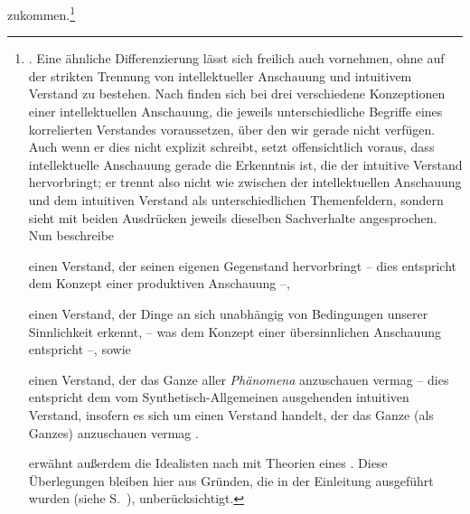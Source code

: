 zukommen.\footnote{\cite[Vgl.][175--180]{Foerster:DieBedeutungvonSS7677deremphKritikderUrteilskraftfuerdieEntwicklungdernachkantischenPhilosophieTeil12002}.
Eine ähnliche Differenzierung lässt sich freilich auch vornehmen, ohne auf der
strikten Trennung von intellektueller Anschauung und intuitivem Verstand zu
bestehen. Nach  finden sich bei
 drei verschiedene Konzeptionen einer intellektuellen
Anschauung, die jeweils unterschiedliche Begriffe eines korrelierten Verstandes
voraussetzen, über den wir gerade nicht verfügen.
Auch wenn er dies nicht explizit schreibt, setzt 
offensichtlich voraus, dass intellektuelle Anschauung gerade die Erkenntnis ist, die der intuitive Verstand
hervorbringt; er trennt also nicht wie
zwischen der intellektuellen Anschauung und dem intuitiven Verstand als
unterschiedlichen Themenfeldern, sondern sieht mit beiden Ausdrücken jeweils
dieselben Sachverhalte angesprochen. Nun beschreibe
\begin{nummerierung}
  \item einen Verstand, der seinen eigenen Gegenstand
  hervorbringt -- dies  entspricht dem Konzept einer produktiven Anschauung --,
  \item einen Verstand, der Dinge an sich unabhängig von Bedingungen
  unserer Sinnlichkeit erkennt, -- was dem Konzept einer übersinnlichen
  Anschauung entspricht --, sowie
  \item  einen Verstand, der das Ganze aller \emph{Phänomena} anzuschauen
  vermag -- dies entspricht dem vom Synthetisch-Allgemeinen ausgehenden
  intuitiven Verstand, insofern es sich um einen Verstand handelt, der das Ganze
  (als Ganzes) anzuschauen
  vermag \parencite[vgl.][288]{Gram:IntellectualIntuition1981}.
\end{nummerierung}
 erwähnt außerdem die
Idealisten nach  mit Theorien eines  \parencite[vgl.][\pno~348,
353\,f.]{Leech:MakingModalDistinctions2014}. Diese Überlegungen bleiben hier
aus Gründen, die in der Einleitung ausgeführt  wurden (siehe
S.~\pageref{Einleitung:AbschnittIdealistennachKant}), unberücksichtigt.}



